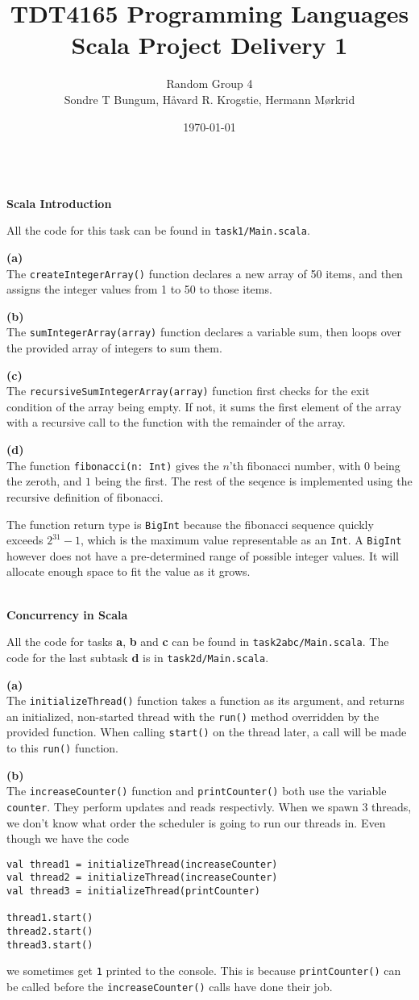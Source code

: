 \documentclass[12pt]{article}
\title{TDT4165 Programming Languages\\Scala Project Delivery 1}
\author{\small{Random Group 4}\\ \small{Sondre T Bungum, Håvard R. Krogstie, Hermann Mørkrid}}
\date{\today}
\newcommand{\task}[1]{\vspace*{5mm}\hspace*{-2cm}\fbox{#1}\\[-5mm]}
\newcommand{\subtask}[1]{\hspace*{-1cm}\textbf{(#1)}\\[-5mm]}
\begin{document}
\maketitle

\task{1}
\textbf{Scala Introduction}

All the code for this task can be found in \verb|task1/Main.scala|.

\subtask{a}
The \verb|createIntegerArray()| function declares a new array of 50 items, and then assigns the integer values from 1 to 50 to those items.

\subtask{b}
The \verb|sumIntegerArray(array)| function declares a variable sum, then loops over the provided array of integers to sum them.

\subtask{c}
The \verb|recursiveSumIntegerArray(array)| function first checks for the exit condition of the array being empty. If not, it sums the first element of the array with a recursive call to the function with the remainder of the array.

\subtask{d}
The function \verb|fibonacci(n: Int)| gives the $n$'th fibonacci number,
with $0$ being the zeroth, and $1$ being the first. The rest of the seqence
is implemented using the recursive definition of fibonacci.

The function return type is \verb|BigInt| because the fibonacci sequence
quickly exceeds $2^{31}-1$, which is the maximum value representable as an \verb|Int|.
A \verb|BigInt| however does not have a pre-determined range of possible integer values.
It will allocate enough space to fit the value as it grows.

\task{2}
\textbf{Concurrency in Scala}

All the code for tasks \textbf{a}, \textbf{b} and \textbf{c} can be found in \verb|task2abc/Main.scala|.
The code for the last subtask \textbf{d} is in \verb|task2d/Main.scala|.

\subtask{a}
The \verb|initializeThread()| function takes a function as its argument, and returns an initialized, non-started thread with the \verb|run()| method overridden by the provided function. When calling \verb|start()| on the thread later, a call will be made to this \verb|run()| function.

\subtask{b}
The \verb|increaseCounter()| function and \verb|printCounter()| both use the variable \verb|counter|.
They perform updates and reads respectivly. When we spawn 3 threads, we don't know what order
the scheduler is going to run our threads in. Even though we have the code
%
\begin{verbatim}
val thread1 = initializeThread(increaseCounter)
val thread2 = initializeThread(increaseCounter)
val thread3 = initializeThread(printCounter)

thread1.start()
thread2.start()
thread3.start()
\end{verbatim}
%
we sometimes get \verb|1| printed to the console. This is because \verb|printCounter()|
can be called before the \verb|increaseCounter()| calls have done their job.
\end{document}
